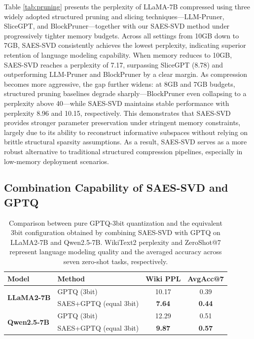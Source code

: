 Table \ref{tab:pruning} presents the perplexity of LLaMA-7B compressed using three widely adopted structured pruning and slicing techniques—LLM-Pruner, SliceGPT, and BlockPruner—together with our SAES-SVD method under progressively tighter memory budgets. Across all settings from 10GB down to 7GB, SAES-SVD consistently achieves the lowest perplexity, indicating superior retention of language modeling capability.
When memory reduces to 10GB, SAES-SVD reaches a perplexity of 7.17, surpassing SliceGPT (8.78) and outperforming LLM-Pruner and BlockPruner by a clear margin. As compression becomes more aggressive, the gap further widens: at 8GB and 7GB budgets, structured pruning baselines degrade sharply—BlockPruner even collapsing to a perplexity above 40—while SAES-SVD maintains stable performance with perplexity 8.96 and 10.15, respectively.
This demonstrates that SAES-SVD provides stronger parameter preservation under stringent memory constraints, largely due to its ability to reconstruct informative subspaces without relying on brittle structural sparsity assumptions. As a result, SAES-SVD serves as a more robust alternative to traditional structured compression pipelines, especially in low-memory deployment scenarios.



\subsection{Combination Capability of SAES-SVD and GPTQ}

\begin{table}[h]
\centering
\caption{{Comparison between pure GPTQ-3bit quantization and the equivalent 3bit configuration obtained by combining SAES-SVD with GPTQ on LLaMA2-7B and Qwen2.5-7B. WikiText2 perplexity and ZeroShot@7 represent language modeling quality and the averaged accuracy across seven zero-shot tasks, respectively.}}
\label{tab:gptq}
\begin{tabular}{l l c c}
\toprule
\textbf{Model} & \textbf{Method} & \textbf{Wiki PPL} & \textbf{AvgAcc@7} \\
\midrule
\multirow{2}{*}{\textbf{LLaMA2-7B}}
& GPTQ (3bit)            & 10.17 & 0.39 \\
& SAES+GPTQ (equal 3bit) & \textbf{7.64} & \textbf{0.44} \\
\midrule
\multirow{2}{*}{\textbf{Qwen2.5-7B}}
& GPTQ (3bit)            & 12.29 & 0.51 \\
& SAES+GPTQ (equal 3bit) & \textbf{9.87} & \textbf{0.57} \\
\bottomrule
\end{tabular}
\end{table}


